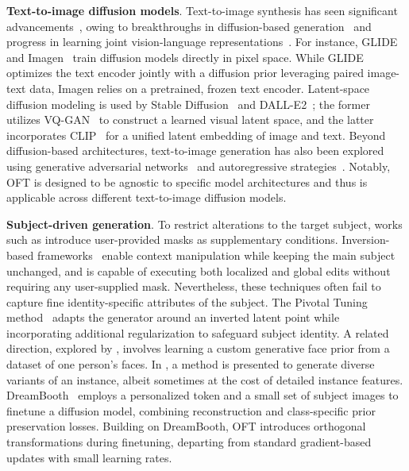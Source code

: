 \textbf{Text-to-image diffusion models}. Text-to-image synthesis has seen significant advancements~\cite{saharia2022photorealistic,ramesh2022hierarchical,rombach2022high,gu2022vector,nichol2022glide}, owing to breakthroughs in diffusion-based generation~\cite{ho2020denoising,song2021score,song2021denoising,dhariwal2021diffusion} and progress in learning joint vision-language representations~\cite{su2020vlbert,lu2019vilbert,radford2021learning,wang2021simvlm,li2022blip,li2023blip,alayrac2022flamingo,schuhmann2022laion}. For instance, GLIDE~\cite{nichol2022glide} and Imagen~\cite{saharia2022photorealistic} train diffusion models directly in pixel space. While GLIDE optimizes the text encoder jointly with a diffusion prior leveraging paired image-text data, Imagen relies on a pretrained, frozen text encoder. Latent-space diffusion modeling is used by Stable Diffusion~\cite{rombach2022high} and DALL-E2~\cite{ramesh2022hierarchical}; the former utilizes VQ-GAN~\cite{esser2021taming} to construct a learned visual latent space, and the latter incorporates CLIP~\cite{radford2021learning} for a unified latent embedding of image and text. Beyond diffusion-based architectures, text-to-image generation has also been explored using generative adversarial networks~\cite{reed2016generative,zhang2017stackgan,xu2018attngan,li2019controllable} and autoregressive strategies~\cite{ramesh2021zero,ding2021cogview,wu2022nuwa,yuscaling}. Notably, OFT is designed to be agnostic to specific model architectures and thus is applicable across different text-to-image diffusion models.

\textbf{Subject-driven generation}. To restrict alterations to the target subject, works such as \cite{avrahami2022blended,nichol2022glide} introduce user-provided masks as supplementary conditions. Inversion-based frameworks~\cite{choi2021ilvr,dhariwal2021diffusion,ramesh2022hierarchical,gal2022image} enable context manipulation while keeping the main subject unchanged, and \cite{hertz2022prompt} is capable of executing both localized and global edits without requiring any user-supplied mask. Nevertheless, these techniques often fail to capture fine identity-specific attributes of the subject. The Pivotal Tuning method~\cite{roich2022pivotal} adapts the generator around an inverted latent point while incorporating additional regularization to safeguard subject identity. A related direction, explored by \cite{nitzan2022mystyle}, involves learning a custom generative face prior from a dataset of one person's faces. In \cite{casanova2021instance}, a method is presented to generate diverse variants of an instance, albeit sometimes at the cost of detailed instance features. DreamBooth~\cite{ruiz2023dreambooth} employs a personalized token and a small set of subject images to finetune a diffusion model, combining reconstruction and class-specific prior preservation losses. Building on DreamBooth, OFT introduces orthogonal transformations during finetuning, departing from standard gradient-based updates with small learning rates.

